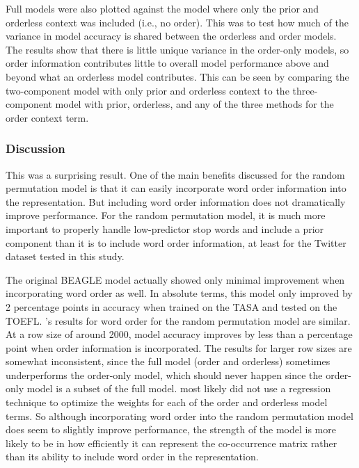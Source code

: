\documentclass[man,floatsintext,donotrepeattitle]{apa6}
\begin{document}
Full models were also plotted against the model where only the prior and orderless context was included (i.e., no order).
This was to test how much of the variance in model accuracy is shared between the orderless and order models.
The results show that there is little unique variance in the order-only models, so order information contributes little to overall model performance above and beyond what an orderless model contributes.
This can be seen by comparing the two-component model with only prior and orderless context to the three-component model with prior, orderless, and any of the three methods for the order context term.

\subsubsection{Discussion}

This was a surprising result.
One of the main benefits discussed for the random permutation model is that it can easily incorporate word order information into the representation.
But including word order information does not dramatically improve performance. 
For the random permutation model, it is much more important to properly handle low-predictor stop words and include a prior component than it is to include word order information,
at least for the Twitter dataset tested in this study.

The original BEAGLE model \parencite{Jones2007} actually showed only minimal improvement when incorporating word order as well.
In absolute terms, this model only improved by 2 percentage points in accuracy when trained on the TASA and tested on the TOEFL.
\textcite{Sahlgren2008}'s results for word order for the random permutation model are similar.
At a row size of around \num{2000}, model accuracy improves by less than a percentage point when order information is incorporated.
The results for larger row sizes are somewhat inconsistent, since the full model (order and orderless) sometimes underperforms the order-only model,
which should never happen since the order-only model is a subset of the full model.
\textcite{Sahlgren2008} most likely did not use a regression technique to optimize the weights for each of the order and orderless model terms.
So although incorporating word order into the random permutation model does seem to slightly improve performance,
the strength of the model is more likely to be in how efficiently it can represent the co-occurrence matrix rather than its ability to include word order in the representation.
\end{document}
